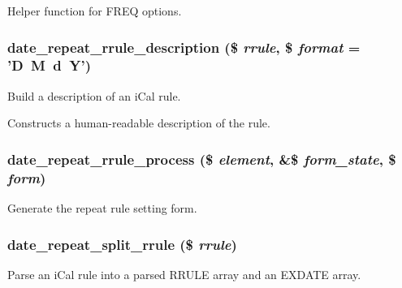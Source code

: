 \label{date__repeat_8module_af608a6efa0eeb6869465857d6d88b2d6}
Helper function for FREQ options. \hypertarget{date__repeat_8module_acaa5064a19a194c235a3616198da2071}{
\subsubsection[{date\_\-repeat\_\-rrule\_\-description}]{\setlength{\rightskip}{0pt plus 5cm}date\_\-repeat\_\-rrule\_\-description (\$ {\em rrule}, \/  \$ {\em format} = {\ttfamily 'D~M~d~Y'})}}
\label{date__repeat_8module_acaa5064a19a194c235a3616198da2071}
Build a description of an iCal rule.

Constructs a human-\/readable description of the rule. \hypertarget{date__repeat_8module_a45198dc27e593ee47661fc205a3e8d31}{
\subsubsection[{date\_\-repeat\_\-rrule\_\-process}]{\setlength{\rightskip}{0pt plus 5cm}date\_\-repeat\_\-rrule\_\-process (\$ {\em element}, \/  \&\$ {\em form\_\-state}, \/  \$ {\em form})}}
\label{date__repeat_8module_a45198dc27e593ee47661fc205a3e8d31}
Generate the repeat rule setting form. \hypertarget{date__repeat_8module_a4f7e5ba566b1e66abea72ccce5efcb64}{
\subsubsection[{date\_\-repeat\_\-split\_\-rrule}]{\setlength{\rightskip}{0pt plus 5cm}date\_\-repeat\_\-split\_\-rrule (\$ {\em rrule})}}
\label{date__repeat_8module_a4f7e5ba566b1e66abea72ccce5efcb64}
Parse an iCal rule into a parsed RRULE array and an EXDATE array. 